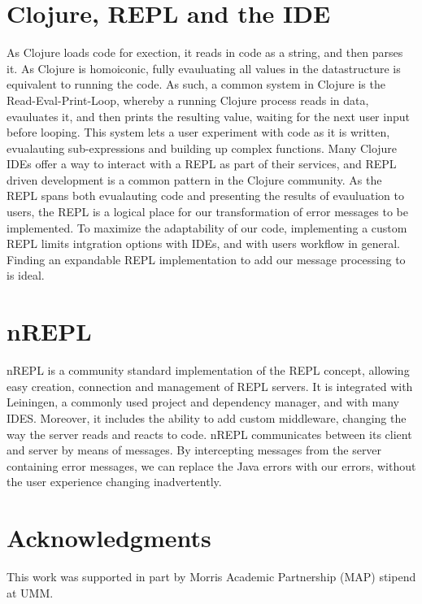 \documentclass[12pt]{article}
\begin{document}
\section{Clojure, REPL and the IDE}


As Clojure loads code for exection, it reads in code as a string,
and then parses it. As Clojure is homoiconic, fully evauluating all values in the datastructure
is equivalent to running the code.
As such, a common system in Clojure is the Read-Eval-Print-Loop, whereby a running Clojure
process reads in data, evauluates it, and then prints the resulting value,
 waiting for the next user input before looping.
This system lets a user experiment with code as it is written,
 evualauting sub-expressions and building up complex functions.
Many Clojure IDEs offer a way to interact with a REPL as part of their services,
 and REPL driven development is a common pattern in the Clojure community.
 As the REPL spans both evualauting code and presenting the results of evauluation to users,
 the REPL is a logical place for our transformation of error messages to be implemented.
 To maximize the adaptability of our code, implementing a custom REPL limits intgration
 options with IDEs, and with users workflow in general.
  Finding an expandable REPL implementation to add our message processing to
  is ideal.


\section{nREPL}
nREPL is a community standard implementation of the REPL concept,
allowing easy creation, connection and management of REPL servers.
It is integrated with Leiningen, a commonly used project and dependency manager,
 and with many IDES. Moreover, it includes the ability to add custom middleware,
  changing the way the server reads and reacts to code.
 nREPL communicates between its client and server by means of messages.
 By intercepting messages from the server containing error messages,
 we can replace the Java errors with our errors,
  without the user experience changing inadvertently.


\section{Acknowledgments}
This work was supported in part by Morris Academic Partnership (MAP) stipend at UMM.




\end{document}
